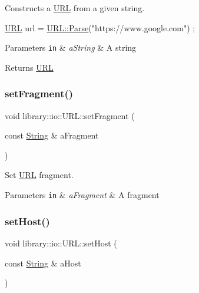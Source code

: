 Constructs a \hyperlink{classlibrary_1_1io_1_1_u_r_l}{U\+RL} from a given string. 


\begin{DoxyCode}
\hyperlink{classlibrary_1_1io_1_1_u_r_l_a7e9c070138a6dbd000ffb10b7cd8a5c4}{URL} url = \hyperlink{classlibrary_1_1io_1_1_u_r_l_a98cf42141cf75e1dd5362eb208a1e2bd}{URL::Parse}(\textcolor{stringliteral}{"https://www.google.com"}) ;
\end{DoxyCode}



\begin{DoxyParams}[1]{Parameters}
\mbox{\tt in}  & {\em a\+String} & A string \\
\hline
\end{DoxyParams}
\begin{DoxyReturn}{Returns}
\hyperlink{classlibrary_1_1io_1_1_u_r_l}{U\+RL} 
\end{DoxyReturn}
\mbox{\label{classlibrary_1_1io_1_1_u_r_l_a0ae406ca81b40b02761918ad953a4255}} 
\subsubsection{\texorpdfstring{set\+Fragment()}{setFragment()}}
{\footnotesize\ttfamily void library\+::io\+::\+U\+R\+L\+::set\+Fragment (\begin{DoxyParamCaption}\item[{const \hyperlink{namespacelibrary_1_1io_a7469b45835a4421045db344d6a5a1f85}{String} \&}]{a\+Fragment }\end{DoxyParamCaption})}



Set \hyperlink{classlibrary_1_1io_1_1_u_r_l}{U\+RL} fragment. 


\begin{DoxyParams}[1]{Parameters}
\mbox{\tt in}  & {\em a\+Fragment} & A fragment \\
\hline
\end{DoxyParams}
\mbox{\label{classlibrary_1_1io_1_1_u_r_l_ab11ded07b47b35dbc0bb6907c0cfd5c5}} 
\subsubsection{\texorpdfstring{set\+Host()}{setHost()}}
{\footnotesize\ttfamily void library\+::io\+::\+U\+R\+L\+::set\+Host (\begin{DoxyParamCaption}\item[{const \hyperlink{namespacelibrary_1_1io_a7469b45835a4421045db344d6a5a1f85}{String} \&}]{a\+Host }\end{DoxyParamCaption})}



